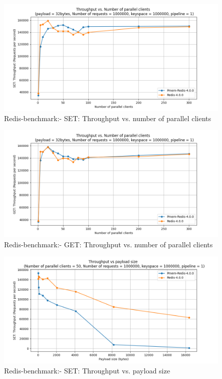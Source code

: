 \documentclass[11pt,swedish, openany, oneside]{book}
\begin{document}
\begin{figure}[H]
    \centering
    \caption{Redis-benchmark:- SET: Throughput vs. number of parallel clients}
    \includegraphics[width=1\textwidth]{pmem-redis/set1.png}
\end{figure}

\begin{figure}[H]
    \centering
    \caption{Redis-benchmark:- GET: Throughput vs. number of parallel clients}
    \includegraphics[width=1\textwidth]{pmem-redis/get1.png}
\end{figure}

\begin{figure}[H]
    \centering
    \caption{Redis-benchmark:- SET: Throughput vs. payload size}
    \includegraphics[width=1\textwidth]{pmem-redis/set3.png}
\end{figure}
\end{document}
